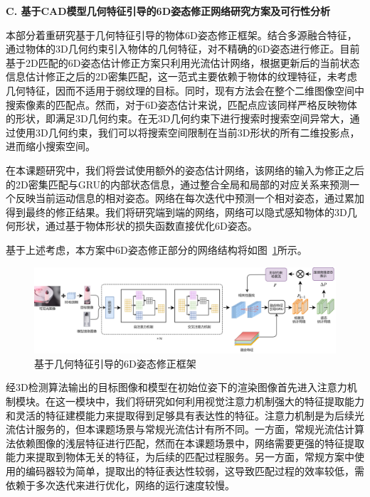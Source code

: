 \documentclass[12pt]{article}
\begin{document}

\textbf{C. 基于CAD模型几何特征引导的6D姿态修正网络研究方案及可行性分析}

本部分着重研究基于几何特征引导的物体6D姿态修正框架。结合多源融合特征，通过物体的3D几何约束引入物体的几何特征，对不精确的6D姿态进行修正。目前基于2D匹配的6D姿态估计修正方案只利用光流估计网络，根据更新后的当前状态信息估计修正之后的2D密集匹配，这一范式主要依赖于物体的纹理特征，未考虑几何特征，因而不适用于弱纹理的目标。同时，现有方法会在整个二维图像空间中搜索像素的匹配点。然而，对于6D姿态估计来说，匹配点应该同样严格反映物体的形状，即满足3D几何约束。在无3D几何约束下进行搜索时搜索空间异常大，通过使用3D几何约束，我们可以将搜索空间限制在当前3D形状的所有二维投影点，进而缩小搜索空间。

在本课题研究中，我们将尝试使用额外的姿态估计网络，该网络的输入为修正之后的2D密集匹配与GRU的内部状态信息，通过整合全局和局部的对应关系来预测一个反映当前运动信息的相对姿态。网络在每次迭代中预测一个相对姿态，通过累加得到最终的修正结果。我们将研究端到端的网络，网络可以隐式感知物体的3D几何形状，通过基于物体形状的损失函数直接优化6D姿态。

基于上述考虑，本方案中6D姿态修正部分的网络结构将如图~\ref{fig:geo_guided_6D_refine}所示。

\begin{figure}[h]
    \centering
    \includegraphics[width=\linewidth]{geo_guided_6d_refine.jpg}
    \caption{基于几何特征引导的6D姿态修正框架}
    \label{fig:geo_guided_6D_refine}
\end{figure}
经3D检测算法输出的目标图像和模型在初始位姿下的渲染图像首先进入注意力机制模块。在这一模块中，我们将研究如何利用视觉注意力机制强大的特征提取能力和灵活的特征建模能力来提取得到足够具有表达性的特征。注意力机制是为后续光流估计服务的，但本课题场景与常规光流估计有所不同。一方面，常规光流估计算法依赖图像的浅层特征进行匹配，然而在本课题场景中，网络需要更强的特征提取能力来提取到物体无关的特征，为后续的匹配过程服务。另一方面，常规方案中使用的编码器较为简单，提取出的特征表达性较弱，这导致匹配过程的效率较低，需依赖于多次迭代来进行优化，网络的运行速度较慢。
\end{document}
